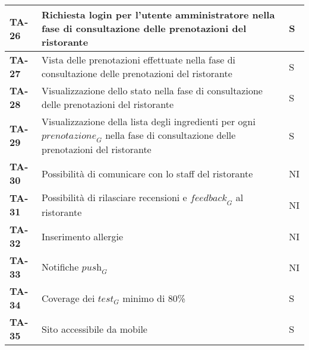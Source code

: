 \begin{longtable}{|>{\centering\arraybackslash}p{1.5cm}|p{14cm}|p{1cm}|}
    \hline
    \textbf{TA-26} & Richiesta login per l'utente amministratore nella fase di consultazione delle prenotazioni del ristorante & S\\
    \hline
    \rowcolor{gray!10}
    \textbf{TA-27} & Vista delle prenotazioni effettuate nella fase di consultazione delle prenotazioni del ristorante & S\\
    \hline
    \textbf{TA-28} & Visualizzazione dello stato nella fase di consultazione delle prenotazioni del ristorante & S\\
    \hline
    \rowcolor{gray!10}
    \textbf{TA-29} & Visualizzazione della lista degli ingredienti per ogni $\textit{prenotazione}_G$ nella fase di consultazione delle prenotazioni del ristorante & S\\
    \hline
    \textbf{TA-30} & Possibilità di comunicare con lo staff del ristorante & NI \\
    \hline
     \rowcolor{gray!10}
    \textbf{TA-31} & Possibilità di rilasciare recensioni e $\textit{feedback}_G$ al ristorante & NI \\
    \hline
    \textbf{TA-32} & Inserimento allergie & NI \\
    \hline
     \rowcolor{gray!10}
    \textbf{TA-33} & Notifiche $\textit{push}_G$ & NI \\
    \hline
    \textbf{TA-34} & Coverage dei $\textit{test}_G$ minimo di 80\% & S\\
    \hline
    \rowcolor{gray!10}
    \textbf{TA-35} & Sito accessibile da mobile & S \\
    \hline
  \end{longtable}
